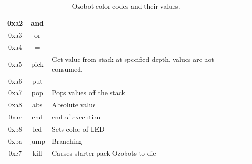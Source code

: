\documentclass[oneside,%
                    author={Malak Hajji},
                    degree={BSc},
                    title={Designing An Accessible Computational Toolkit For Students},
                  subtitle={With Mixed Visual Abilities}]{dissertation}
\begin{document}
\begin{table}
\begin{tabular}{|c|c|l|}
0xa2 &and &\\ \hline 
0xa3 &or &\\ \hline 
0xa4 &= &\\ \hline 
0xa5 &pick &Get value from stack at specified depth, values are not consumed.
\\ \hline 
0xa6 &put &\\ \hline 
0xa7 &pop &Pops values off the stack\\ \hline 
0xa8 &abs &Absolute value\\ \hline 
0xae &end  &end of execution\\ \hline 
0xb8 &led  &Sets color of LED\\ \hline 
0xba &jump  &Branching \\ \hline 
0xc7 &kill &Causes starter pack Ozobots to die \\ \hline 

\hline
\end{tabular}
\caption{Ozobot color codes and their values.}
\label{tab-bytecode}
\end{table}
\end{document}
